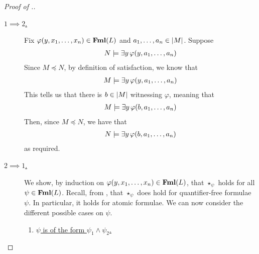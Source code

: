 \begin{proof}[Proof of .]
    \begin{description}
        \item[\underline{$1 \implies 2$.}]
        Fix  $\varphi\!\left( y, x_1, \ldots, x_n \right) \in \mathbf{Fml}(L)$ and $a_1, \ldots, a_n \in \left\lvert M \right\rvert$. Suppose
        \begin{align*}
            N \models \exists y \, \varphi\!\left( y ,a_1, \ldots, a_n \right)
        \end{align*}
        Since $M \preceq N$, by definition of satisfaction, we know that
        \begin{align*}
            M \models \exists y \, \varphi\!\left( y ,a_1, \ldots, a_n \right)
        \end{align*}
        This tells us that there is $b \in \left\lvert M \right\rvert$ witnessing $\varphi$, meaning that
        \begin{align*}
            M \models \exists y \, \varphi\!\left( b ,a_1, \ldots, a_n \right)
        \end{align*}
        Then, since $M \preceq N$, we have that
        \begin{align*}
            N \models \exists y \, \varphi\!\left( b ,a_1, \ldots, a_n \right)
        \end{align*}
        as required.

        \item[\underline{$2 \implies 1$.}]
        We show, by induction on $\varphi\!\left( y, x_1, \ldots, x_n \right) \in \mathbf{Fml}(L)$, that $\star_{\psi}$ holds for all $\psi \in \mathbf{Fml}(L)$. Recall, from , that $\star_{\psi}$ does hold for quantifier-free formulae $\psi$. In particular, it holds for atomic formulae. We can now consider the different possible cases on $\psi$.
        \begin{enumerate}
            \item \underline{$\psi$ is of the form $\psi_1 \land \psi_2$.} \newline
            \sorry


\end{enumerate}
\end{description}
\end{proof}
